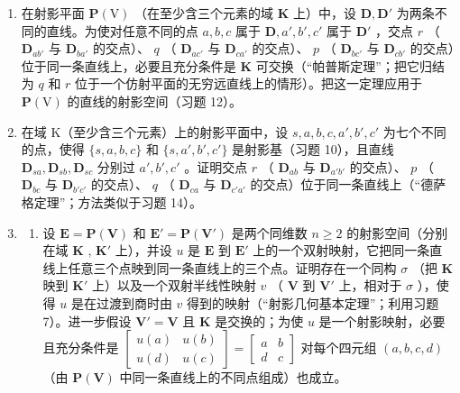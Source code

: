 \begin{enumerate}
\def\labelenumi{\arabic{enumi}.}
\setcounter{enumi}{13}
\item
  在射影平面 \(\mathbf{P}(\mathrm{V})\) （在至少含三个元素的域 \(\mathbf{K}\) 上）中，设 \(\mathbf{D}, \mathbf{D}'\) 为两条不同的直线。为使对任意不同的点 \(a, b, c\) 属于 \(\mathbf{D}, a', b', c'\) 属于 \(\mathbf{D}'\) ，交点 \(r\) （ \(\mathbf{D}_{ab'}\) 与 \(\mathbf{D}_{ba'}\) 的交点）、 \(q\) （ \(\mathbf{D}_{ac'}\) 与 \(\mathbf{D}_{ca'}\) 的交点）、 \(p\) （ \(\mathbf{D}_{bc'}\) 与 \(\mathbf{D}_{cb'}\) 的交点）位于同一条直线上，必要且充分条件是 \(\mathbf{K}\) 可交换（“帕普斯定理”；把它归结为 \(q\) 和 \(r\) 位于一个仿射平面的无穷远直线上的情形）。把这一定理应用于 \(\mathbf{P}(\mathrm{V})\) 的直线的射影空间（习题 12）。
\item
  在域 K（至少含三个元素）上的射影平面中，设 \(s, a, b, c, a', b', c'\) 为七个不同的点，使得 \(\{s, a, b, c\}\) 和 \(\{s, a', b', c'\}\) 是射影基（习题 10），且直线 \(\mathbf{D}_{sa}, \mathbf{D}_{sb}, \mathbf{D}_{sc}\) 分别过 \(a', b', c'\) 。证明交点 \(r\) （ \(\mathbf{D}_{ab}\) 与 \(\mathbf{D}_{a'b'}\) 的交点）、 \(p\) （ \(\mathbf{D}_{bc}\) 与 \(\mathbf{D}_{b'c'}\) 的交点）、 \(q\) （ \(\mathbf{D}_{ca}\) 与 \(\mathbf{D}_{c'a'}\) 的交点）位于同一条直线上（“德萨格定理”；方法类似于习题 14）。
\item
  \begin{enumerate}
  \def\labelenumii{(\alph{enumii})}
  \tightlist
  \item
    设 \(\mathbf{E} = \mathbf{P}(\mathbf{V})\) 和 \(\mathbf{E}' = \mathbf{P}(\mathbf{V}')\) 是两个同维数 \(n \geqslant 2\) 的射影空间（分别在域 \(\mathbf{K}\) , \(\mathbf{K}'\) 上），并设 \(u\) 是 \(\mathbf{E}\) 到 \(\mathbf{E}'\) 上的一个双射映射，它把同一条直线上任意三个点映到同一条直线上的三个点。证明存在一个同构 \(\sigma\) （把 \(\mathbf{K}\) 映到 \(\mathbf{K}'\) 上）以及一个双射半线性映射 \(v\) （ \(\mathbf{V}\) 到 \(\mathbf{V}'\) 上，相对于 \(\sigma\) ），使得 \(u\) 是在过渡到商时由 \(v\) 得到的映射（“射影几何基本定理”；利用习题 7）。进一步假设 \(\mathbf{V}' = \mathbf{V}\) 且 \(\mathbf{K}\) 是交换的；为使 \(u\) 是一个射影映射，必要且充分条件是 \(\begin{bmatrix} u(a) & u(b) \\ u(d) & u(c) \end{bmatrix} = \begin{bmatrix} a & b \\ d & c \end{bmatrix}\) 对每个四元组 \((a, b, c, d)\) （由 \(\mathbf{P}(\mathbf{V})\) 中同一条直线上的不同点组成）也成立。
  \end{enumerate}
\end{enumerate}

